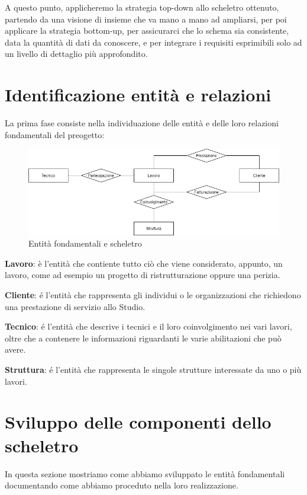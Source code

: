 \documentclass{elegantbook}
\begin{document}
        A questo punto, applicheremo la strategia top-down allo scheletro ottenuto, partendo da una visione di insieme che va mano a mano
        ad ampliarsi, per poi applicare la strategia bottom-up, per assicurarci che lo schema sia consistente, data la quantità di dati da conoscere,
        e per integrare i requisiti esprimibili solo ad un livello di dettaglio più approfondito.

	\section{Identificazione entità e relazioni}
        La prima fase consiste nella individuazione delle entità e delle loro relazioni fondamentali del preogetto: 

        \begin{figure}[H]
            \includegraphics[width=15cm]{../Img/DBSchemes/scheletro.png}
            \caption{Entità fondamentali e scheletro}
        \end{figure}
        
        \textbf{Lavoro}: è l'entità che contiente tutto ciò che viene considerato, appunto, un lavoro, come ad esempio un progetto di ristrutturazione
        oppure una perizia.

        \textbf{Cliente}: é l'entità che rappresenta gli individui o le organizzazioni che richiedono una prestazione di servizio allo Studio.

        \textbf{Tecnico}: é l'entità che descrive i tecnici e il loro coinvolgimento nei vari lavori, oltre che a contenere le informazioni riguardanti
        le varie abilitazioni che può avere.

        \textbf{Struttura}: é l'entità che rappresenta le singole strutture interessate da uno o più lavori.

	\section{Sviluppo delle componenti dello scheletro}
        In questa sezione mostriamo come abbiamo sviluppato le entità fondamentali documentando come abbiamo proceduto nella loro realizzazione. 
\end{document}
